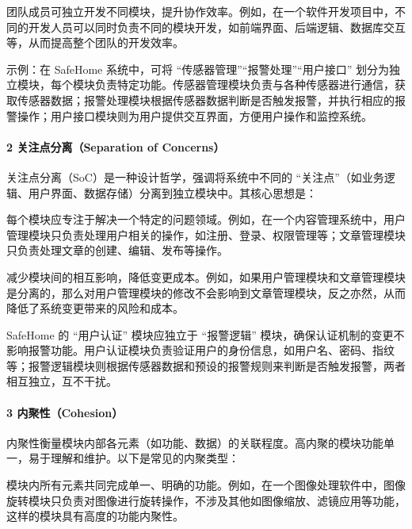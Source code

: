团队成员可独立开发不同模块，提升协作效率。例如，在一个软件开发项目中，不同的开发人员可以同时负责不同的模块开发，如前端界面、后端逻辑、数据库交互等，从而提高整个团队的开发效率。

示例：在 SafeHome 系统中，可将 ``传感器管理''``报警处理''``用户接口'' 划分为独立模块，每个模块负责特定功能。传感器管理模块负责与各种传感器进行通信，获取传感器数据；报警处理模块根据传感器数据判断是否触发报警，并执行相应的报警操作；用户接口模块则为用户提供交互界面，方便用户操作和监控系统。

\hypertarget{ux5173ux6ce8ux70b9ux5206ux79bbseparation-of-concerns}{%
\paragraph{2 关注点分离（Separation of Concerns）}\label{ux5173ux6ce8ux70b9ux5206ux79bbseparation-of-concerns}}

关注点分离（SoC）是一种设计哲学，强调将系统中不同的 ``关注点''（如业务逻辑、用户界面、数据存储）分离到独立模块中。其核心思想是：

每个模块应专注于解决一个特定的问题领域。例如，在一个内容管理系统中，用户管理模块只负责处理用户相关的操作，如注册、登录、权限管理等；文章管理模块只负责处理文章的创建、编辑、发布等操作。

减少模块间的相互影响，降低变更成本。例如，如果用户管理模块和文章管理模块是分离的，那么对用户管理模块的修改不会影响到文章管理模块，反之亦然，从而降低了系统变更带来的风险和成本。

SafeHome 的 ``用户认证'' 模块应独立于 ``报警逻辑'' 模块，确保认证机制的变更不影响报警功能。用户认证模块负责验证用户的身份信息，如用户名、密码、指纹等；报警逻辑模块则根据传感器数据和预设的报警规则来判断是否触发报警，两者相互独立，互不干扰。

\hypertarget{ux5185ux805aux6027cohesion}{%
\paragraph{3 内聚性（Cohesion）}\label{ux5185ux805aux6027cohesion}}

内聚性衡量模块内部各元素（如功能、数据）的关联程度。高内聚的模块功能单一，易于理解和维护。以下是常见的内聚类型：

模块内所有元素共同完成单一、明确的功能。例如，在一个图像处理软件中，图像旋转模块只负责对图像进行旋转操作，不涉及其他如图像缩放、滤镜应用等功能，这样的模块具有高度的功能内聚性。

